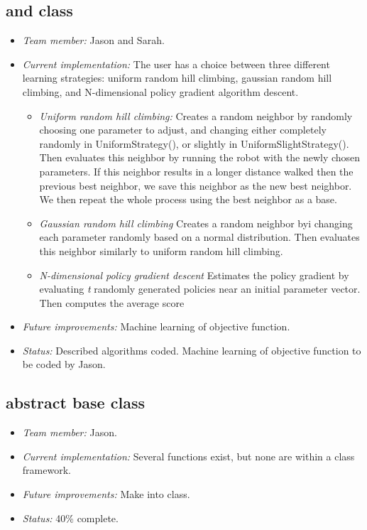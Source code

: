 \subsection*{ and  class}

\begin{itemize}
\item \emph{Team member:} Jason and Sarah.
\item \emph{Current implementation:} The user has a choice between three
  different learning strategies: uniform random hill climbing, gaussian random
  hill climbing, and N-dimensional policy gradient algorithm descent.
  \begin{itemize} 
  \item \emph{Uniform random hill climbing:} Creates a random neighbor by
  randomly choosing one parameter to adjust, and changing either
  completely randomly in UniformStrategy(), or slightly in
  UniformSlightStrategy(). Then evaluates this neighbor by running the robot
  with the newly chosen parameters. If this neighbor results in a
  longer distance walked then the previous best neighbor, we save this
  neighbor as the new best neighbor. We then repeat the whole process
  using the best neighbor as a base.
  \item \emph{Gaussian random hill climbing} Creates a random neighbor byi
  changing each parameter randomly based on a normal distribution. Then
  evaluates this neighbor similarly to uniform random hill climbing.
  \item \emph{N-dimensional policy gradient descent} Estimates the policy
  gradient by evaluating \emph{t} randomly generated policies
  near an initial parameter vector. Then computes the average score 
  \end{itemize}
\item \emph{Future improvements:} Machine learning of objective function.
\item \emph{Status:} Described algorithms coded. Machine learning of objective
  function to be coded by Jason.
\end{itemize}



\subsection*{ abstract base class}

\begin{itemize}
\item \emph{Team member:} Jason.
\item \emph{Current implementation:} Several functions exist, but none are within a class framework.
\item \emph{Future improvements:} Make into class.
\item \emph{Status:} 40\% complete.
\end{itemize}



